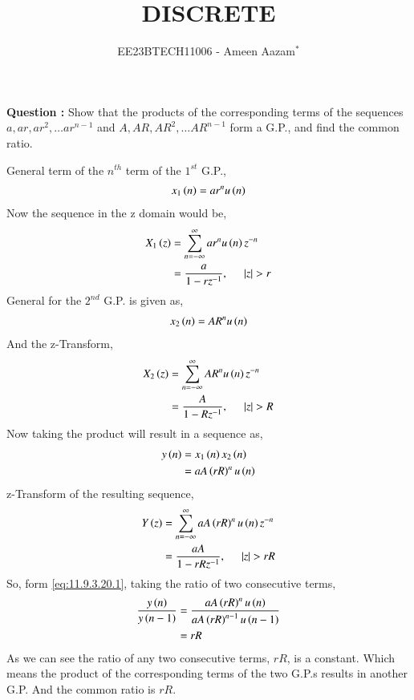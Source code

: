 \documentclass[journal,12pt,twocolumn]{IEEEtran}
\theoremstyle{remark}
\begin{document}

\vspace{3cm}

\title{DISCRETE}
\author{EE23BTECH11006 - Ameen Aazam$^{*}$%
}
\maketitle
\newpage
\bigskip

\renewcommand{\thefigure}{\theenumi}
\renewcommand{\thetable}{\theenumi}

\vspace{3cm}
\textbf{Question :}
Show that the products of the corresponding terms of the sequences $a, ar, ar^2, \ldots ar^{n-1}$ and $A, AR, AR^2, \ldots AR^{n-1}$ form a G.P., and find the common ratio.

\solution

General term of the $n^{th}$ term of the $1^{st}$ G.P.,
\begin{align}
    x_1\left(n\right)=ar^nu\left(n\right)
\end{align}
Now the sequence in the z domain would be,
\begin{align}
    X_1\brak{z}&=\sum\limits_{n=-\infty}^{\infty}ar^nu\brak{n}z^{-n} \\
    &=\frac{a}{1-rz^{-1}},\hspace{0.5cm}|z|>r
\end{align}
General for the $2^{nd}$ G.P. is given as,
\begin{align}
    x_2\left(n\right)=AR^nu\left(n\right)
\end{align}
And the z-Transform,
\begin{align}
    X_2\brak{z}&=\sum\limits_{n=-\infty}^{\infty}AR^nu\brak{n}z^{-n} \\
    &=\frac{A}{1-Rz^{-1}},\hspace{0.5cm}|z|>R
\end{align}
Now taking the product will result in a sequence as,
\begin{align}
    y\left(n\right)&=x_1\left(n\right)x_2\left(n\right) \\
    &=aA\left(rR\right)^nu\left(n\right) \label{eq:11.9.3.20.1}
\end{align}
z-Transform of the resulting sequence,
\begin{align}
    Y\brak{z}&=\sum\limits_{n=-\infty}^{\infty}aA\brak{rR}^nu\brak{n}z^{-n} \\
    &=\frac{aA}{1-rRz^{-1}},\hspace{0.5cm}|z|>rR
\end{align}
So, form \ref{eq:11.9.3.20.1}, taking the ratio of two consecutive terms,
\begin{align}
    \frac{y\left(n\right)}{y\left(n-1\right)}&=\frac{aA\left(rR\right)^nu\left(n\right)}{aA\left(rR\right)^{n-1}u\left(n-1\right)} \\
    &=rR
\end{align}
As we can see the ratio of any two consecutive terms, $rR$, is a constant. Which means the product of the corresponding terms of the two G.P.s results in another G.P.
And the common ratio is $rR$.
\end{document}
